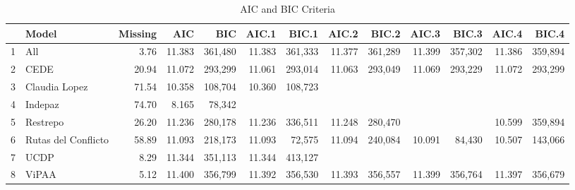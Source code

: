 \begin{table}[ht]
\centering
\begin{tabular}{rlrrrrrrrrrrr}
  \hline
 & Model & Missing & AIC & BIC & AIC.1 & BIC.1 & AIC.2 & BIC.2 & AIC.3 & BIC.3 & AIC.4 & BIC.4 \\ 
  \hline
1 & All & 3.76 & 11.383 & 361,480 & 11.383 & 361,333 & 11.377 & 361,289 & 11.399 & 357,302 & 11.386 & 359,894 \\ 
  2 & CEDE & 20.94 & 11.072 & 293,299 & 11.061 & 293,014 & 11.063 & 293,049 & 11.069 & 293,229 & 11.072 & 293,299 \\ 
  3 & Claudia Lopez & 71.54 & 10.358 & 108,704 & 10.360 & 108,723 &  &  &  &  &  &  \\ 
  4 & Indepaz & 74.70 & 8.165 & 78,342 &  &  &  &  &  &  &  &  \\ 
  5 & Restrepo & 26.20 & 11.236 & 280,178 & 11.236 & 336,511 & 11.248 & 280,470 &  &  & 10.599 & 359,894 \\ 
  6 & Rutas del Conflicto & 58.89 & 11.093 & 218,173 & 11.093 & 72,575 & 11.094 & 240,084 & 10.091 & 84,430 & 10.507 & 143,066 \\ 
  7 & UCDP & 8.29 & 11.344 & 351,113 & 11.344 & 413,127 &  &  &  &  &  &  \\ 
  8 & ViPAA & 5.12 & 11.400 & 356,799 & 11.392 & 356,530 & 11.393 & 356,557 & 11.399 & 356,764 & 11.397 & 356,679 \\ 
   \hline
\end{tabular}
\caption{AIC and BIC Criteria} 
\end{table}
